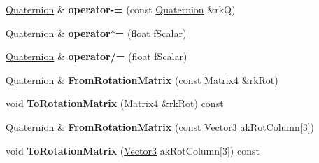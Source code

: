 \begin{DoxyCompactItemize}
\item 
\hyperlink{class_i_dream_sky_1_1_quaternion}{Quaternion} \& {\bfseries operator-\/=} (const \hyperlink{class_i_dream_sky_1_1_quaternion}{Quaternion} \&rkQ)\hypertarget{class_i_dream_sky_1_1_quaternion_adfdc712b4ab1c11f22b304871ebc0faa}{}\label{class_i_dream_sky_1_1_quaternion_adfdc712b4ab1c11f22b304871ebc0faa}

\item 
\hyperlink{class_i_dream_sky_1_1_quaternion}{Quaternion} \& {\bfseries operator$\ast$=} (float f\+Scalar)\hypertarget{class_i_dream_sky_1_1_quaternion_aec80c59016ae99ef27f6b709c901f806}{}\label{class_i_dream_sky_1_1_quaternion_aec80c59016ae99ef27f6b709c901f806}

\item 
\hyperlink{class_i_dream_sky_1_1_quaternion}{Quaternion} \& {\bfseries operator/=} (float f\+Scalar)\hypertarget{class_i_dream_sky_1_1_quaternion_aa4cd592c599799502807638c4d74e679}{}\label{class_i_dream_sky_1_1_quaternion_aa4cd592c599799502807638c4d74e679}

\item 
\hyperlink{class_i_dream_sky_1_1_quaternion}{Quaternion} \& {\bfseries From\+Rotation\+Matrix} (const \hyperlink{class_i_dream_sky_1_1_matrix4}{Matrix4} \&rk\+Rot)\hypertarget{class_i_dream_sky_1_1_quaternion_a3c4faad300d6c95723f59189d76ca893}{}\label{class_i_dream_sky_1_1_quaternion_a3c4faad300d6c95723f59189d76ca893}

\item 
void {\bfseries To\+Rotation\+Matrix} (\hyperlink{class_i_dream_sky_1_1_matrix4}{Matrix4} \&rk\+Rot) const \hypertarget{class_i_dream_sky_1_1_quaternion_aa69a1d170614e5388a9ddf1bb00771ed}{}\label{class_i_dream_sky_1_1_quaternion_aa69a1d170614e5388a9ddf1bb00771ed}

\item 
\hyperlink{class_i_dream_sky_1_1_quaternion}{Quaternion} \& {\bfseries From\+Rotation\+Matrix} (const \hyperlink{class_i_dream_sky_1_1_vector3}{Vector3} ak\+Rot\+Column\mbox{[}3\mbox{]})\hypertarget{class_i_dream_sky_1_1_quaternion_a443df77eebd4a22a859ac25f94d24fca}{}\label{class_i_dream_sky_1_1_quaternion_a443df77eebd4a22a859ac25f94d24fca}

\item 
void {\bfseries To\+Rotation\+Matrix} (\hyperlink{class_i_dream_sky_1_1_vector3}{Vector3} ak\+Rot\+Column\mbox{[}3\mbox{]}) const \hypertarget{class_i_dream_sky_1_1_quaternion_af026e3296620b348a35527221363d5ba}{}\label{class_i_dream_sky_1_1_quaternion_af026e3296620b348a35527221363d5ba}


\end{DoxyCompactItemize}
